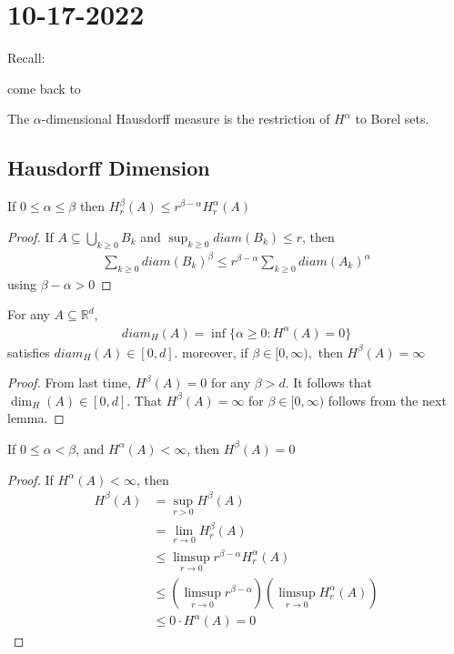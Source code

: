 \section{10-17-2022}


Recall:

come back to

The $\alpha$-dimensional Hausdorff measure is the restriction of $H^{\alpha}$ to Borel sets.

\subsection{Hausdorff Dimension}

\begin{lemma}
	If $0 \leq \alpha \leq \beta$ then $H^{\beta}_r (A) \leq r^{\beta - \alpha} H^{\alpha}_{r} (A)$
\end{lemma}

\begin{proof}
	If $A \subseteq \bigcup_{k \geq 0} B_{k}$ and $\sup_{k \geq 0} diam (B_{k}) \leq r$, 
	then 
	\begin{align*}
		\sum_{k \geq 0} diam (B_{k})^{\beta} \leq r^{\beta - \alpha} \sum_{k \geq 0} diam (A_{k})^{\alpha}
	\end{align*} 
	using $ \beta - \alpha > 0$
\end{proof}

\begin{theorem}
	For any $A \subseteq \mathbb{R}^{d},$ 
	\begin{align*}
		diam_{H}(A) = \inf \{\alpha \geq 0 : H^{\alpha}(A) = 0\}
	\end{align*} 
	satisfies $diam_{H}(A) \in [0, d]$. moreover, if $\beta \in [0, \infty),$ then $H^{\beta}(A) = \infty$
\end{theorem}

\begin{proof}
	From last time, $H^{\beta}(A) = 0$ for any $\beta > d$. It follows that $\dim_{H}(A) \in [0, d]$.
	That $H^{\beta}(A) = \infty$ for $\beta \in [0, \infty)$ follows from the next lemma.
\end{proof}

\begin{lemma}
If $0 \leq \alpha < \beta$, and $H^{\alpha}(A) < \infty$, then $H^{\beta} (A) = 0$
\end{lemma}

\begin{proof}
	If $H^{\alpha}(A) < \infty$, then
	\begin{align*}
		H^{\beta} (A) &= \sup_{r > 0} H^{\beta} (A) \\
					  &= \lim_{r \to 0} H_{r}^{\beta} (A) \\
					  &\leq \limsup_{r \to 0} r^{\beta - \alpha} H_{r}^{\alpha} (A) \\
					  &\leq ( \limsup_{r \to 0} r^{\beta - \alpha} ) ( \limsup_{r \to 0} H_{r}^{\alpha} (A) ) \\
					  &\leq 0 \cdot H^{\alpha} (A) = 0
	\end{align*}
\end{proof}

